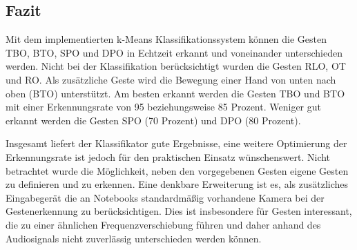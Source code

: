 \subsection{Fazit}

Mit dem implementierten k-Means Klassifikationssystem können die Gesten \ac{TBO}, BTO, \ac{SPO} und \ac{DPO} in Echtzeit erkannt und voneinander unterschieden werden.
Nicht bei der Klassifikation berücksichtigt wurden die Gesten \ac{RLO}, \ac{OT} und \ac{RO}. Als zusätzliche Geste wird die Bewegung einer Hand von unten nach oben (BTO) unterstützt.
Am besten erkannt werden die Gesten \ac{TBO} und BTO mit einer Erkennungsrate von 95 beziehungsweise 85 Prozent. Weniger gut erkannt werden die Gesten \ac{SPO} (70 Prozent) und \ac{DPO} (80 Prozent). 

Insgesamt liefert der Klassifikator gute Ergebnisse, eine weitere Optimierung der Erkennungsrate ist jedoch 
für den praktischen Einsatz wünschenswert.
Nicht betrachtet wurde die Möglichkeit, neben den vorgegebenen Gesten eigene Gesten zu definieren und zu erkennen. Eine denkbare Erweiterung ist es, als zusätzliches Eingabegerät die an Notebooks standardmäßig vorhandene Kamera bei der Gestenerkennung zu berücksichtigen. Dies ist insbesondere für Gesten interessant, die zu einer ähnlichen Frequenzverschiebung führen und daher anhand des Audiosignals nicht zuverlässig unterschieden werden können. 

